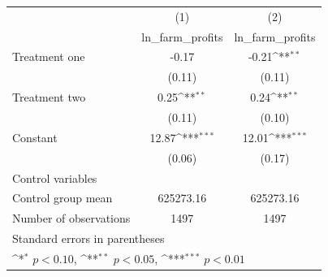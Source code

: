{
\def\sym#1{\ifmmode^{#1}\else\(^{#1}\)\fi}
\begin{tabular}{l*{2}{c}}
\hline\hline
                    &\multicolumn{1}{c}{(1)}&\multicolumn{1}{c}{(2)}\\
                    &\multicolumn{1}{c}{ln\_farm\_profits}&\multicolumn{1}{c}{ln\_farm\_profits}\\
\hline
Treatment one       &       -0.17         &       -0.21\sym{**} \\
                    &      (0.11)         &      (0.11)         \\
[1em]
Treatment two       &        0.25\sym{**} &        0.24\sym{**} \\
                    &      (0.11)         &      (0.10)         \\
[1em]
Constant            &       12.87\sym{***}&       12.01\sym{***}\\
                    &      (0.06)         &      (0.17)         \\
\hline
Control variables   &                     &                     \\
Control group mean  &   625273.16         &   625273.16         \\
Number of observations&        1497         &        1497         \\
\hline\hline
\multicolumn{3}{l}{\footnotesize Standard errors in parentheses}\\
\multicolumn{3}{l}{\footnotesize \sym{*} \(p<0.10\), \sym{**} \(p<0.05\), \sym{***} \(p<0.01\)}\\
\end{tabular}
}
